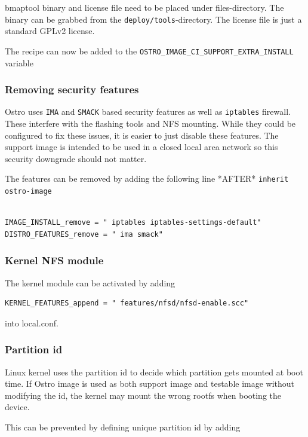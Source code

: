 \documentclass[a4paper,11pt]{article}
\newcommand{\cmd}[1]{\texttt{#1}}
\begin{document}
bmaptool binary and license file need to be placed under files-directory. The binary can be grabbed from the \cmd{deploy/tools}-directory. The license file is just a standard GPLv2 license.

The recipe can now be added to the \cmd{OSTRO\_IMAGE\_CI\_SUPPORT\_EXTRA\_INSTALL} variable

\subsubsection*{Removing security features}

Ostro uses \cmd{IMA} and \cmd{SMACK} based security features as well as \cmd{iptables} firewall. These interfere with the flashing tools and NFS mounting. While they could be configured to fix these issues, it is easier to just disable these features. The support image is intended to be used in a closed local area network so this security downgrade should not matter.

The features can be removed by adding the following line *AFTER* \cmd{inherit ostro-image}

\begin{lstlisting}

IMAGE_INSTALL_remove = " iptables iptables-settings-default"
DISTRO_FEATURES_remove = " ima smack"

\end{lstlisting}

\subsubsection*{Kernel NFS module}

The kernel module can be activated by adding

\begin{lstlisting}
KERNEL_FEATURES_append = " features/nfsd/nfsd-enable.scc"
\end{lstlisting}
into local.conf. 

\subsubsection*{Partition id}

Linux kernel uses the partition id to decide which partition gets mounted at boot time. If Ostro image is used as both support image and testable image without modifying the id, the kernel may mount the wrong rootfs when booting the device.

This can be prevented by defining unique partition id by adding
\end{document}
